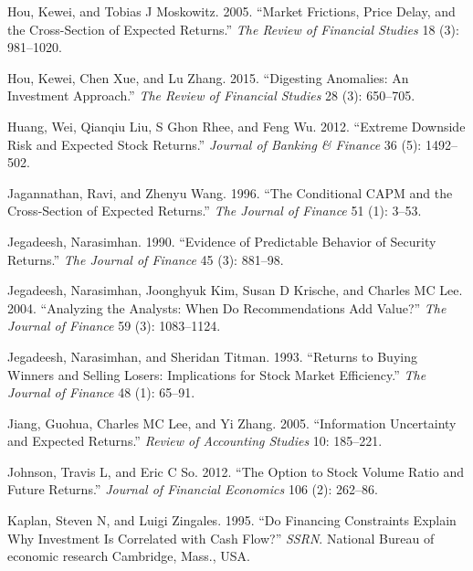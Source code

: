 \documentclass[
  letterpaper,
  DIV=11,
  numbers=noendperiod]{scrreprt}
\newlength{\cslhangindent}
\newlength{\cslentryspacingunit} %
\newenvironment{CSLReferences}[2] %
 {%
  \setlength{\parindent}{0pt}
  \ifodd #1
  \let\oldpar\par
  \def\par{\hangindent=\cslhangindent\oldpar}
  \fi
  \setlength{\parskip}{#2\cslentryspacingunit}
 }%
 {}
\begin{document}
\begin{CSLReferences}{1}{0}
\leavevmode{}%
Hou, Kewei, and Tobias J Moskowitz. 2005. {``Market Frictions, Price
Delay, and the Cross-Section of Expected Returns.''} \emph{The Review of
Financial Studies} 18 (3): 981--1020.

\leavevmode{}%
Hou, Kewei, Chen Xue, and Lu Zhang. 2015. {``Digesting Anomalies: An
Investment Approach.''} \emph{The Review of Financial Studies} 28 (3):
650--705.

\leavevmode{}%
Huang, Wei, Qianqiu Liu, S Ghon Rhee, and Feng Wu. 2012. {``Extreme
Downside Risk and Expected Stock Returns.''} \emph{Journal of Banking \&
Finance} 36 (5): 1492--502.

\leavevmode{}%
Jagannathan, Ravi, and Zhenyu Wang. 1996. {``The Conditional CAPM and
the Cross-Section of Expected Returns.''} \emph{The Journal of Finance}
51 (1): 3--53.

\leavevmode{}%
Jegadeesh, Narasimhan. 1990. {``Evidence of Predictable Behavior of
Security Returns.''} \emph{The Journal of Finance} 45 (3): 881--98.

\leavevmode{}%
Jegadeesh, Narasimhan, Joonghyuk Kim, Susan D Krische, and Charles MC
Lee. 2004. {``Analyzing the Analysts: When Do Recommendations Add
Value?''} \emph{The Journal of Finance} 59 (3): 1083--1124.

\leavevmode{}%
Jegadeesh, Narasimhan, and Sheridan Titman. 1993. {``Returns to Buying
Winners and Selling Losers: Implications for Stock Market Efficiency.''}
\emph{The Journal of Finance} 48 (1): 65--91.

\leavevmode{}%
Jiang, Guohua, Charles MC Lee, and Yi Zhang. 2005. {``Information
Uncertainty and Expected Returns.''} \emph{Review of Accounting Studies}
10: 185--221.

\leavevmode{}%
Johnson, Travis L, and Eric C So. 2012. {``The Option to Stock Volume
Ratio and Future Returns.''} \emph{Journal of Financial Economics} 106
(2): 262--86.

\leavevmode{}%
Kaplan, Steven N, and Luigi Zingales. 1995. {``Do Financing Constraints
Explain Why Investment Is Correlated with Cash Flow?''} \emph{SSRN}.
National Bureau of economic research Cambridge, Mass., USA.


\end{CSLReferences}
\end{document}

